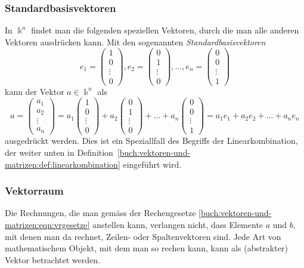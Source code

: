 \subsubsection{Standardbasisvektoren}
%
In $\Bbbk^n$ findet man die folgenden speziellen Vektoren, durch die
man alle anderen Vektoren ausdrücken kann.
Mit den sogenannten {\em Standardbasisvektoren}
\[
e_1=\begin{pmatrix}1\\0\\\vdots\\0\end{pmatrix},
e_2=\begin{pmatrix}0\\1\\\vdots\\0\end{pmatrix},
\dots,
e_n=\begin{pmatrix}0\\0\\\vdots\\1\end{pmatrix}
\]
kann der Vektor $a\in\Bbbk^n$ als
\[
a
=
\begin{pmatrix}a_1\\a_2\\\vdots\\a_n\end{pmatrix}
=
a_1 \begin{pmatrix}1\\0\\\vdots\\0\end{pmatrix}
+
a_2 \begin{pmatrix}0\\1\\\vdots\\0\end{pmatrix}
+
\dots
+
a_n \begin{pmatrix}0\\0\\\vdots\\1\end{pmatrix}
=
a_1e_1+a_2e_2+\dots+a_ne_n
\]
ausgedrückt werden.
Dies ist ein Speziallfall des Begriffs der Linearkombination, der
weiter unten in
Definition~\ref{buch:vektoren-und-matrizen:def:linearkombination}
eingeführt wird.

\subsubsection{Vektorraum}
Die Rechnungen, die man gemäss der Rechengesetze
\eqref{buch:vektoren-und-matrizen:eqn:vrgesetze}
anstellen kann, verlangen nicht, dass Elemente $a$ und $b$, mit denen man
da rechnet, Zeilen- oder Spaltenvektoren sind.
Jede Art von mathematischem Objekt, mit dem man so rechen kann,
kann als (abstrakter) Vektor betrachtet werden.

